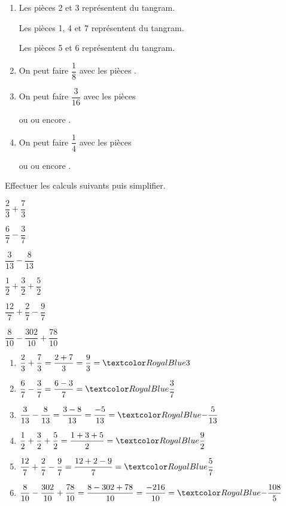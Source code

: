 \begin{Maquette}[Fiche,CorrigeFin,Colonnes=2]{}
\begin{multicols}{2}
      \begin{Solution}
         \begin{enumerate}
            \item Les pièces 2 et 3 représentent  du tangram. \par
               Les pièces 1, 4 et 7 représentent  du tangram. \par
               Les pièces 5 et 6 représentent  du tangram.
            \item On peut faire $\dfrac18$ avec les pièces .
            \item On peut faire $\dfrac{3}{16}$ avec les pièces  \par
                ou  ou encore .
            \item On peut faire $\dfrac14$ avec les pièces  \par
                ou  ou  encore .
         \end{enumerate}
      \end{Solution}

      
      \begin{exercice} %
         Effectuer les calculs suivants puis simplifier. \medskip
         \begin{colenumerate}
            \item $\dfrac23+\dfrac73$ \medskip
            \item $\dfrac67-\dfrac37$ \medskip
            \item $\dfrac3{13}-\dfrac8{13}$ \medskip
            \item $\dfrac12+\dfrac32+\dfrac52$
            \item $\dfrac{12}7+\dfrac27-\dfrac97$
            \item $\dfrac8{10}-\dfrac{302}{10}+\dfrac{78}{10}$
         \end{colenumerate}
      \end{exercice}
      
      \begin{Solution}
         \begin{enumerate}
            \item $\dfrac23+\dfrac73 =\dfrac{2+7}{3} =\dfrac93 =\cor{3}$
            \item $\dfrac67-\dfrac37 =\dfrac{6-3}{7} =\cor{\dfrac37}$
            \item $\dfrac3{13}-\dfrac8{13} =\dfrac{3-8}{13} =\dfrac{-5}{13} =\cor{-\dfrac{5}{13}}$
            \item $\dfrac12+\dfrac32+\dfrac52 =\dfrac{1+3+5}{2} =\cor{\dfrac92}$
            \item $\dfrac{12}7+\dfrac27-\dfrac97 =\dfrac{12+2-9}{7} =\cor{\dfrac{5}{7}}$
            \item $\dfrac8{10}-\dfrac{302}{10}+\dfrac{78}{10} =\dfrac{8-302+78}{10} =\dfrac{-216}{10} =\cor{-\dfrac{108}{5}}$
         \end{enumerate}
      \end{Solution}
      

\end{multicols}
\end{Maquette}
